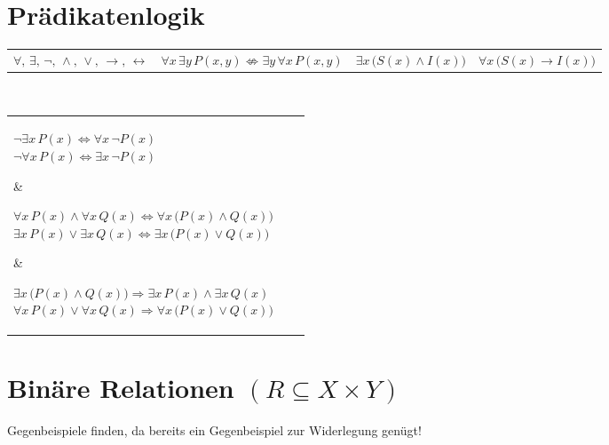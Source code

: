 \documentclass[a4paper,10pt,titlepage]{scrartcl}
\begin{document}
\section*{Prädikatenlogik}
\label{sec:praedikatenlogik}
\begin{tabular}{llll}
$\forall\text{, }\exists\text{, }\neg\text{, }\wedge\text{, }\vee\text{, }\to\text{, }\leftrightarrow$
& \quad $\forall x\, \exists y\, P(x,y)\nLeftrightarrow \exists y\, \forall x\, P(x,y)$
& \qquad \qquad $\exists x\,\bigl(S(x)\wedge I(x)\bigr)$
& \quad $\forall x\, \bigl(S(x)\to I(x)\bigr)$\\
\end{tabular}
\smallskip\\
\noindent
\begin{tabular}{lll}
 \parbox{3.6cm}{%
  $\neg\exists x\, P(x) \Leftrightarrow \forall x\, \neg P(x)$\\
  $\neg\forall x\, P(x) \Leftrightarrow \exists x\, \neg P(x)$
 }
&
 \parbox{6.2cm}{%
  $\forall x\, P(x) \wedge \forall x\, Q(x) \Leftrightarrow \forall x\, \bigl(P(x)\wedge Q(x)\bigr)$\\
  $\exists x\, P(x) \vee   \exists x\, Q(x) \Leftrightarrow \exists x\, \bigl(P(x)\vee   Q(x)\bigr)$
 }
&
 \parbox{2cm}{%
  ${\exists x\,\bigl(P(x)\wedge Q(x)\bigr) \Rightarrow \exists x\, P(x) \wedge \exists x\, Q(x)}$\\
  ${\forall x\, P(x) \vee \forall x\, Q(x) \Rightarrow \forall x\, \bigl(P(x)\vee Q(x)\bigr)}$
 }
\\
\end{tabular}



\section*{Binäre Relationen {\fontsize{9pt}{0pt}\selectfont $(R\subseteq X\times Y)$}}
\label{sec:binaere_relationen}
Gegenbeispiele finden, da bereits ein Gegenbeispiel zur Widerlegung genügt!
\end{document}
